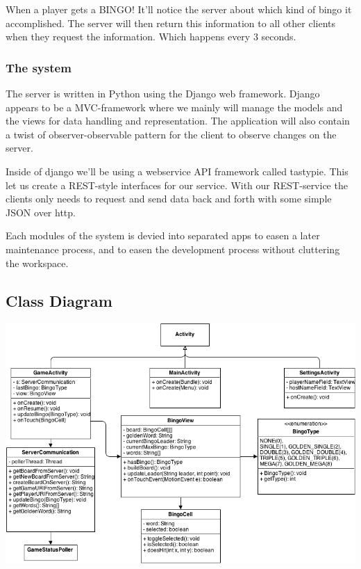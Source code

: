 When a player gets a BINGO! It'll notice the server about which kind of bingo it accomplished. The server will then return this information to all other clients when they request the information. Which happens every 3 seconds.

\subsubsection{The system}
The server is written in Python using the Django web framework. Django appears to be a MVC-framework where we mainly will manage the models and the views for data handling and representation. The application will also contain a twist of observer-observable pattern for the client to observe changes on the server.

Inside of django we'll be using a webservice API framework called tastypie. This let us create a REST-style interfaces for our service. With our REST-service the clients only needs to request and send data back and forth with some simple JSON over http.

Each modules of the system is devied into separated apps to easen a later maintenance process, and to easen the development process without cluttering the workspace.

\subsection{Class Diagram}

\begin{center}
\includegraphics[scale=0.5]{Pikks/ClassDiagramFinal}
\end{center}

